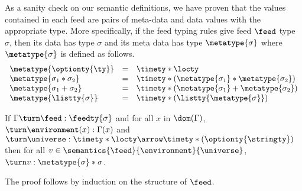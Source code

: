 As a sanity check on our semantic definitions, we have proven
that the values contained in each feed are pairs of meta-data and data
values with the appropriate type.  More specifically, if the feed typing
rules give feed $\feed$ type $\sigma$, then its data has type $\sigma$ and
its meta data has type $\metatype{\sigma}$ where $\metatype{\sigma}$ is
defined as follows.
\[
\begin {array} {lcl}
\metatype{\optionty{\ty}} & = & \timety * \locty \\
\metatype{\sigma_1 * \sigma_2} & = & \timety * (\metatype{\sigma_1} * \metatype{\sigma_2}) \\
\metatype{\sigma_1 + \sigma_2} & = & \timety * (\metatype{\sigma_1} + \metatype{\sigma_2}) \\
\metatype{\listty{\sigma}} & = & \timety * (\listty{\metatype{\sigma}}) \\
\end{array}
\]
\begin{theorem}
If $\Gamma \turn \feed : \feedty{\sigma}$ and
for all $x$ in $\dom(\Gamma)$, $\turn \environment(x) : \Gamma(x)$
and $\turn \universe : \timety * \locty \arrow \timety * (\optionty{\stringty})$
then
for all $v \in \semantics{\feed}{\environment}{\universe}$,
$\turn v : \metatype{\sigma} * \sigma$. 
\end{theorem}
The proof follows by induction on the structure of $\feed$.



